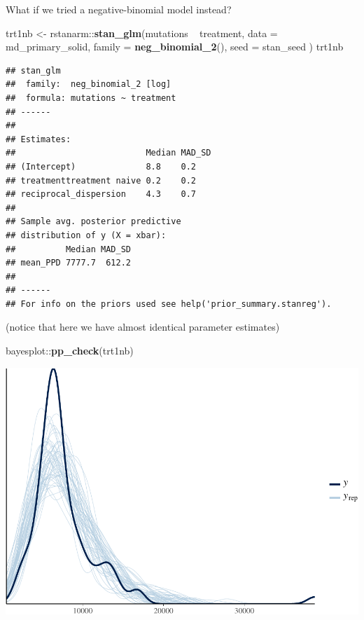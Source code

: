 \documentclass[]{article}
\newenvironment{Shaded}{\begin{snugshade}}{\end{snugshade}}
\newcommand{\KeywordTok}[1]{\textcolor[rgb]{0.13,0.29,0.53}{\textbf{{#1}}}}
\newcommand{\DataTypeTok}[1]{\textcolor[rgb]{0.13,0.29,0.53}{{#1}}}
\newcommand{\StringTok}[1]{\textcolor[rgb]{0.31,0.60,0.02}{{#1}}}
\newcommand{\NormalTok}[1]{{#1}}
\begin{document}
What if we tried a negative-binomial model instead?

\begin{Shaded}
\begin{Highlighting}[]
\NormalTok{trt1nb <-}\StringTok{ }\NormalTok{rstanarm::}\KeywordTok{stan_glm}\NormalTok{(mutations ~}\StringTok{ }\NormalTok{treatment,}
                             \DataTypeTok{data =} \NormalTok{md_primary_solid,}
                             \DataTypeTok{family =} \KeywordTok{neg_binomial_2}\NormalTok{(),}
                             \DataTypeTok{seed =} \NormalTok{stan_seed}
\NormalTok{)}
\NormalTok{trt1nb}
\end{Highlighting}
\end{Shaded}

\begin{verbatim}
## stan_glm
##  family:  neg_binomial_2 [log]
##  formula: mutations ~ treatment
## ------
## 
## Estimates:
##                          Median MAD_SD
## (Intercept)              8.8    0.2   
## treatmenttreatment naive 0.2    0.2   
## reciprocal_dispersion    4.3    0.7   
## 
## Sample avg. posterior predictive 
## distribution of y (X = xbar):
##          Median MAD_SD
## mean_PPD 7777.7  612.2
## 
## ------
## For info on the priors used see help('prior_summary.stanreg').
\end{verbatim}

(notice that here we have almost identical parameter estimates)

\begin{Shaded}
\begin{Highlighting}[]
\NormalTok{bayesplot::}\KeywordTok{pp_check}\NormalTok{(trt1nb)}
\end{Highlighting}
\end{Shaded}

\includegraphics{Hierarchical_model_mutations_and_peptides_files/figure-latex/psolid-trt1nb-ppcheck-1.pdf}
\end{document}
